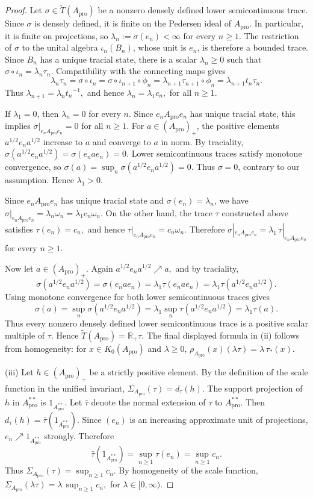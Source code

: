 \documentclass[10pt,a4paper]{amsart}
\newcommand{\R}{\mathbb{R}}
\newcommand{\ex}{\mathrm{pro}}
\begin{document}
\begin{proof}
Let $\sigma\in\widetilde T(A_{\ex})$ be a nonzero densely defined lower
semicontinuous trace. Since $\sigma$ is densely defined, it is finite on the
Pedersen ideal of $A_{\ex}$. In particular, it is finite on projections, so $\lambda_n:=\sigma(e_n)<\infty$ for every  $n\geq1$.
The restriction of $\sigma$ to the unital algebra $\iota_n(B_n)$, whose unit
is $e_n$, is therefore a bounded trace. Since $B_n$ has a unique tracial
state, there is a scalar $\lambda_n\geq0$ such that $\sigma\circ\iota_n=\lambda_n\tau_n.$
Compatibility with the connecting maps gives
\[
\lambda_n\tau_n
=
\sigma\circ\iota_n
=
\sigma\circ\iota_{n+1}\circ\phi_n
=
\lambda_{n+1}\tau_{n+1}\circ\phi_n
=
\lambda_{n+1}t_n\tau_n.
\]
Thus $\lambda_{n+1}={\lambda_n}{t_n}^{-1},$ and hence
$\lambda_n=\lambda_1c_n,$
for all $n\geq1$.

If $\lambda_1=0$, then $\lambda_n=0$ for every $n$. Since $e_nA_{\ex}e_n$
has unique tracial state, this implies $\sigma|_{e_nA_{\ex}e_n}=0$
for all $n\geq1$. For $a\in (A_{\ex})_+$, the positive elements $a^{1/2}e_na^{1/2}$
increase to $a$ and converge to
$a$ in norm. By traciality,
$\sigma(a^{1/2}e_na^{1/2})=\sigma(e_nae_n)=0.$
Lower semicontinuous traces satisfy monotone convergence, so $\sigma(a)=\sup_n\sigma(a^{1/2}e_na^{1/2})=0.$
Thus $\sigma=0$, contrary to our assumption. Hence $\lambda_1>0$.

Since $e_nA_{\ex}e_n$ has unique tracial state and $\sigma(e_n)=\lambda_n$, we have $\sigma|_{e_nA_{\ex}e_n}=\lambda_n\omega_n
=\lambda_1 c_n\omega_n.$
On the other hand, the trace $\tau$ constructed above satisfies $\tau(e_n)=c_n,$
and hence $\tau|_{e_nA_{\ex}e_n}=c_n\omega_n.$
Therefore $\sigma|_{e_nA_{\ex}e_n}=\lambda_1\,\tau|_{e_nA_{\ex}e_n}$ for every $n\geq1$.

Now let $a\in (A_{\ex})_+$. Again $a^{1/2}e_na^{1/2}\nearrow a,$
and by traciality,
\[
\sigma(a^{1/2}e_na^{1/2})
=
\sigma(e_nae_n)
=
\lambda_1\tau(e_nae_n)
=
\lambda_1\tau(a^{1/2}e_na^{1/2}).
\]
Using monotone convergence for both lower semicontinuous traces gives
\[
\sigma(a)
=
\sup_n\sigma(a^{1/2}e_na^{1/2})
=
\lambda_1\sup_n\tau(a^{1/2}e_na^{1/2})
=
\lambda_1\tau(a).
\]
Thus every nonzero densely defined lower semicontinuous trace is a positive
scalar multiple of $\tau$. Hence $\widetilde T(A_{\ex})=\R_+\tau.$ The final displayed formula in \textup{(ii)} follows from homogeneity:
for $x\in K_0(A_{\ex})$ and $\lambda\geq0$, $\rho_{A_{\ex}}(x)(\lambda\tau)=\lambda\,\tau_*(x).$

\smallskip

\noindent
\textup{(iii)}
Let $h\in (A_{\ex})_+$ be a strictly positive element. By the definition of the scale
function in the unified invariant, $\Sigma_{A_{\ex}}(\tau)=d_\tau(h).$
The support projection of $h$ in $A_{\ex}^{**}$ is $1_{A_{\ex}^{**}}$. Let
$\bar\tau$ denote the normal extension of $\tau$ to $A_{\ex}^{**}$. Then
$d_\tau(h)=\bar\tau(1_{A_{\ex}^{**}}).$
Since $(e_n)$ is an increasing approximate unit of projections, $e_n\nearrow
1_{A_{\ex}^{**}}$ strongly. Therefore
\[
\bar\tau(1_{A_{\ex}^{**}})
=
\sup_{n\geq1}\tau(e_n)
=
\sup_{n\geq1}c_n.
\]
Thus $\Sigma_{A_{\ex}}(\tau)=\sup_{n\geq1}c_n.$
By homogeneity of the scale function, $
\Sigma_{A_{\ex}}(\lambda\tau)=\lambda\,\sup_{n\geq1}c_n,$ for $
\lambda\in[0,\infty).$


\end{proof}
\end{document}
